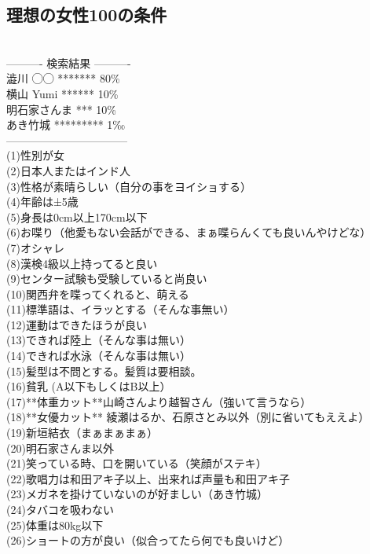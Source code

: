 \subsection{理想の女性100の条件}
　\\
---------- 検索結果 ---------- \\
    澁川 ◯◯ *******  80\%\\
    横山 Yumi ******  10\%\\
    明石家さんま *** 10\%\\
    あき竹城 *********  1‰\\
---------------------------------\\
(1)性別が女\\
(2)日本人またはインド人\\
(3)性格が素晴らしい（自分の事をヨイショする）\\
(4)年齢は±5歳\\
(5)身長は0cm以上170cm以下\\
(6)お喋り（他愛もない会話ができる、まぁ喋らんくても良いんやけどな）\\
(7)オシャレ\\
(8)漢検4級以上持ってると良い\\
(9)センター試験も受験していると尚良い\\
(10)関西弁を喋ってくれると、萌える\\
(11)標準語は、イラッとする（そんな事無い）\\
(12)運動はできたほうが良い\\
(13)できれば陸上（そんな事は無い）\\
(14)できれば水泳（そんな事は無い）\\
(15)髪型は不問とする。髪質は要相談。\\
(16)貧乳  (A以下もしくはB以上）\\
(17)**体重カット**山崎さんより越智さん（強いて言うなら）\\
(18)**女優カット** 綾瀬はるか、石原さとみ以外（別に省いてもええよ）\\
(19)新垣結衣（まぁまぁまぁ）\\
(20)明石家さんま以外\\
(21)笑っている時、口を開いている（笑顔がステキ）\\
(22)歌唱力は和田アキ子以上、出来れば声量も和田アキ子\\
(23)メガネを掛けていないのが好ましい（あき竹城）\\
(24)タバコを吸わない\\
(25)体重は80kg以下\\
(26)ショートの方が良い（似合ってたら何でも良いけど）\\
